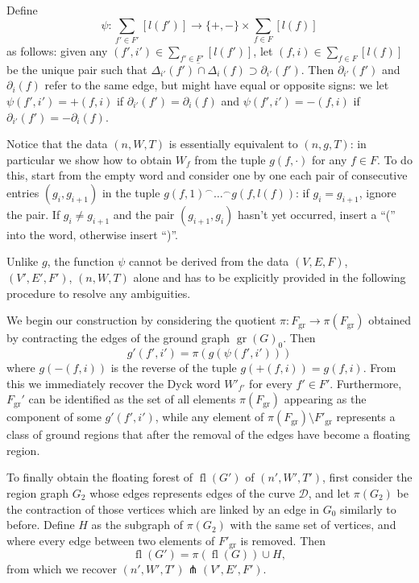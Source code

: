\documentclass[11pt,reqno]{amsart}
\theoremstyle{plain}
\theoremstyle{definition}
\theoremstyle{remark}
\numberwithin{equation}{subsection}
\newcommand*{\calD}{\mathcal{D}}
\newcommand*{\calF}{\mathcal{F}}
\DeclareMathOperator{\gr}{gr}
\DeclareMathOperator{\fl}{fl}
\begin{document}
Define
\[\psi\colon\sum_{f'\in F'}[l(f')]\to\{+,-\}\times\sum_{f\in F}[l(f)]\]
as follows: given any $(f',i')\in\sum_{f'\in F'}[l(f')]$, let $(f,i)\in\sum_{f\in F}[l(f)]$ be the unique pair such that $\overline{\Delta_{i'}(f')\cap\Delta_i(f)}\supset\partial_{i'}(f')$. Then $\partial_{i'}(f')$ and $\partial_i(f)$ refer to the same edge, but might have equal or opposite signs: we let $\psi(f',i')=+(f,i)$ if $\partial_{i'}(f')=\partial_i(f)$ and $\psi(f',i')=-(f,i)$ if $\partial_{i'}(f')=-\partial_i(f)$.



Notice that the data $(n,W,T)$ is essentially equivalent to $(n,g,T)$: in particular we show how to obtain $W_f$ from the tuple $g(f,\cdot)$ for any $f\in F$. To do this, start from the empty word and consider one by one each pair of consecutive entries $(g_i,g_{i+1})$ in the tuple $g(f,1)^\frown\dots^\frown g(f,l(f))$: if $g_i=g_{i+1}$, ignore the pair. If $g_i\neq g_{i+1}$ and the pair $(g_{i+1},g_{i})$ hasn't yet occurred, insert a ``('' into the word, otherwise insert ``)''.

Unlike $g$, the function $\psi$ cannot be derived from the data $(V,E,F)$, $(V',E',F')$, $(n,W,T)$ alone and has to be explicitly provided in the following procedure to resolve any ambiguities.

We begin our construction by considering the quotient $\pi\colon F_{\gr}\to\pi(F_{\gr})$ obtained by contracting the edges of the ground graph $\gr(G)_0$. Then
\[g'(f',i')=\pi(g(\psi(f',i')))\]
where $g(-(f,i))$ is the reverse of the tuple $g(+(f,i))=g(f,i)$. From this we immediately recover the Dyck word $W'_{f'}$ for every $f'\in F'$. Furthermore, $F_{\gr}'$ can be identified as the set of all elements $\pi(F_{\gr})$ appearing as the component of some $g'(f',i')$, while any element of $\pi(F_{\gr})\setminus F'_{\gr}$ represents a class of ground regions that after the removal of the edges have become a floating region.

To finally obtain the floating forest of $\fl(G')$ of $(n',W',T')$, first consider the region graph $G_2$ whose edges represents edges of the curve $\calD$, and let $\pi(G_2)$ be the contraction of those vertices which are linked by an edge in $G_0$ similarly to before. Define $H$ as the subgraph of $\pi(G_2)$ with the same set of vertices, and where every edge between two elements of $F'_{\gr}$ is removed. Then
\[\fl(G')=\pi(\fl(G))\cup H,\]
from which we recover $(n',W',T')\pitchfork(V',E',F')$.
\end{document}
